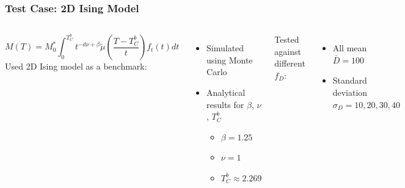 \documentclass{beamer}
\begin{document}
\begin{frame}
	\frametitle{Test Case: 2D Ising Model}
	\begin{columns}
	\column{7cm}
		\small{
		$$
		M(T) = M_0^*\int_0^{T_C^b} t^{-d\nu +\beta} \tilde{\mu}\left(\frac{T-T_C^b}{t}\right) f_t(t) dt
		$$}
		Used 2D Ising model as a benchmark:
		\begin{itemize}
			\item{Simulated using Monte Carlo}
			\item{Analytical results for $\beta$, $\nu$, $T_C^b$}
			\begin{itemize}
				\item{$\beta = 1.25$}
				\item{$\nu=1$}
				\item{$T_C^b \approx 2.269$}
			\end{itemize}
		\end{itemize} \vspace{4mm}
		
		Tested against different $f_D$:
		\begin{itemize}
			\item{All mean $\bar{D}=100$}
			\item{Standard deviation $\sigma_D=10, 20, 30 ,40$}
		\end{itemize}
	\column{5cm}
		\includegraphics[width=4.5cm]{Images/distros}
		
		\includegraphics[width=4.5cm]{Images/unconst}
	\end{columns}
\end{frame}
\end{document}

